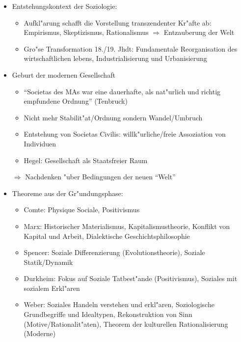 \begin{itemize}
	\item
		Entstehungskontext der Soziologie:
		\begin{itemize}
			\item
				Aufkl"arung schafft die Vorstellung transzendenter Kr"afte ab: Empirismus, Skeptizismus, Rationalismus $\Rightarrow$ Entzauberung der Welt
			\item
				Gro"se Transformation 18./19. Jhdt: Fundamentale Reorganisation des wirtschaftlichen lebens, Industrialisierung und Urbanisierung
		\end{itemize}
	\item
		Geburt der modernen Gesellschaft
		\begin{itemize}
			\item
				\enquote{Societas des MAs war eine dauerhafte, als nat"urlich und richtig empfundene Ordnung} (Tenbruck)
			\item
				Nicht mehr Stabilit"at/Ordnung sondern Wandel/Umbruch
			\item
				Entstehung von Societas Civilis: willk"urliche/freie Assoziation von Individuen
			\item
				Hegel: Gesellschaft als Staatsfreier Raum
		\end{itemize}
		$\Rightarrow$ Nachdenken "uber Bedingungen der neuen \enquote{Welt}
	\item

		Theoreme aus der Gr"undungsphase:
		\begin{itemize}
			\item
				Comte: Physique Sociale, Positivismus
			\item
				Marx: Historischer Materialismus, Kapitalismustheorie, Konflikt von Kapital und Arbeit, Dialektische Geschichtsphilosophie
			\item
				Spencer: Soziale Differenzierung (Evolutionstheorie), Soziale Statik/Dynamik
			\item
				Durkheim: Fokus auf Soziale Tatbest"ande (Positivismus), Soziales mit sozialem Erkl"aren
			\item
				Weber: Soziales Handeln verstehen und erkl"aren, Soziologische Grundbegriffe und Idealtypen, Rekonstruktion von Sinn (Motive/Rationalit"aten), Theorem der kulturellen Rationalisierung (Moderne)
		\end{itemize}
\end{itemize}


